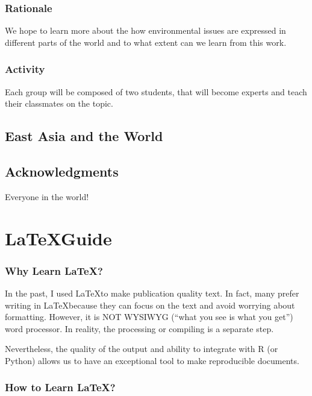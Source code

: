 \documentclass{book}\usepackage{knitr}
\begin{document}
\subsection{Rationale}

We hope to learn more about the how environmental issues are expressed in different parts of the world and to what extent can we learn from this work. 

\subsection{Activity}

Each group will be composed of two students, that will become experts and teach their classmates on the topic. 

\section{East Asia and the World}







\section{Acknowledgments}

Everyone in the world!




\chapter{\LaTeX Guide}\label{ch:guide}

\subsection*{Why Learn \LaTeX?}

In the past, I used \LaTeX to make publication quality text. In fact, many prefer writing in \LaTeX because they can focus on the text and avoid worrying about formatting. However, it is NOT WYSIWYG (``what you see is what you get'') word processor. In reality, the processing or compiling is a separate step. 

Nevertheless, the quality of the output and ability to integrate with R (or Python) allows us to have an exceptional tool to make reproducible documents. 

\subsection*{How to Learn \LaTeX?}
\end{document}
